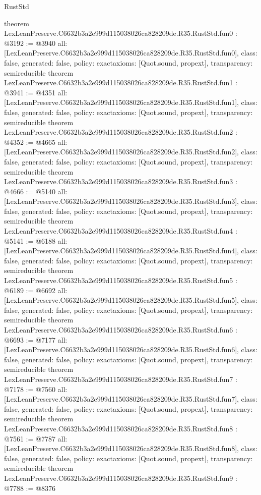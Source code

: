 \begin{lexlean}{RustStd}
\begin{coremodule}
{}
theorem LexLeanPreserve.C6632b3a2e999d115038026ca828209de.R35.RustStd.fun0 : @3192 := @3940 {
  all: [LexLeanPreserve.C6632b3a2e999d115038026ca828209de.R35.RustStd.fun0],
  class: false,
  generated: false,
  policy: exact{axioms: [Quot.sound, propext]},
  transparency: semireducible
}
theorem LexLeanPreserve.C6632b3a2e999d115038026ca828209de.R35.RustStd.fun1 : @3941 := @4351 {
  all: [LexLeanPreserve.C6632b3a2e999d115038026ca828209de.R35.RustStd.fun1],
  class: false,
  generated: false,
  policy: exact{axioms: [Quot.sound, propext]},
  transparency: semireducible
}
theorem LexLeanPreserve.C6632b3a2e999d115038026ca828209de.R35.RustStd.fun2 : @4352 := @4665 {
  all: [LexLeanPreserve.C6632b3a2e999d115038026ca828209de.R35.RustStd.fun2],
  class: false,
  generated: false,
  policy: exact{axioms: [Quot.sound, propext]},
  transparency: semireducible
}
theorem LexLeanPreserve.C6632b3a2e999d115038026ca828209de.R35.RustStd.fun3 : @4666 := @5140 {
  all: [LexLeanPreserve.C6632b3a2e999d115038026ca828209de.R35.RustStd.fun3],
  class: false,
  generated: false,
  policy: exact{axioms: [Quot.sound, propext]},
  transparency: semireducible
}
theorem LexLeanPreserve.C6632b3a2e999d115038026ca828209de.R35.RustStd.fun4 : @5141 := @6188 {
  all: [LexLeanPreserve.C6632b3a2e999d115038026ca828209de.R35.RustStd.fun4],
  class: false,
  generated: false,
  policy: exact{axioms: [Quot.sound, propext]},
  transparency: semireducible
}
theorem LexLeanPreserve.C6632b3a2e999d115038026ca828209de.R35.RustStd.fun5 : @6189 := @6692 {
  all: [LexLeanPreserve.C6632b3a2e999d115038026ca828209de.R35.RustStd.fun5],
  class: false,
  generated: false,
  policy: exact{axioms: [Quot.sound, propext]},
  transparency: semireducible
}
theorem LexLeanPreserve.C6632b3a2e999d115038026ca828209de.R35.RustStd.fun6 : @6693 := @7177 {
  all: [LexLeanPreserve.C6632b3a2e999d115038026ca828209de.R35.RustStd.fun6],
  class: false,
  generated: false,
  policy: exact{axioms: [Quot.sound, propext]},
  transparency: semireducible
}
theorem LexLeanPreserve.C6632b3a2e999d115038026ca828209de.R35.RustStd.fun7 : @7178 := @7560 {
  all: [LexLeanPreserve.C6632b3a2e999d115038026ca828209de.R35.RustStd.fun7],
  class: false,
  generated: false,
  policy: exact{axioms: [Quot.sound, propext]},
  transparency: semireducible
}
theorem LexLeanPreserve.C6632b3a2e999d115038026ca828209de.R35.RustStd.fun8 : @7561 := @7787 {
  all: [LexLeanPreserve.C6632b3a2e999d115038026ca828209de.R35.RustStd.fun8],
  class: false,
  generated: false,
  policy: exact{axioms: [Quot.sound, propext]},
  transparency: semireducible
}
theorem LexLeanPreserve.C6632b3a2e999d115038026ca828209de.R35.RustStd.fun9 : @7788 := @8376 {
}
\end{coremodule}
\end{lexlean}
